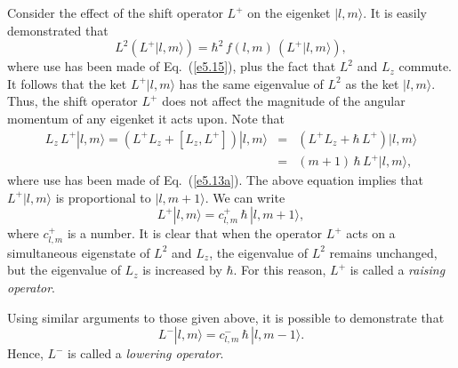 Consider the effect of the shift operator $L^+$ on the eigenket $|l, m\rangle$.
It is easily demonstrated that
\begin{equation}
L^2 (L^+ |l, m\rangle) = \hbar^2\, f(l,m)\, (L^+ |l,m\rangle),
\end{equation}
where use has been made of Eq.~(\ref{e5.15}), plus
the fact that $L^2$ and $L_z$ commute. 
It follows that the ket $L^+ |l,m\rangle$ has the same
eigenvalue of $L^2$ as the ket $|l,m\rangle$. Thus, the shift operator
$L^+$ does not affect the magnitude of the angular momentum of 
any eigenket it acts upon. Note that
\begin{eqnarray}
L_z \,L^+ |l, m\rangle = (L^+ L_z + [L_z, L^+])|l,m\rangle
&=& (L^+ L_z + \hbar\, L^+) |l,m\rangle\nonumber\\[0.5ex]
&=& (m+1)\,\hbar \,L^+|l, m\rangle,
\end{eqnarray}
where use has been made of Eq.~(\ref{e5.13a}). The above equation implies
that $L^+ |l,m\rangle$ is proportional to $|l, m+1\rangle$. We can
write
\begin{equation}\label{e5.23}
L^+ |l ,m\rangle = c^+_{l, m}\, \hbar\,|l, m+1\rangle,
\end{equation}
where $c^+_{l, m}$ is a number. It is clear that when the operator $L^+$ 
acts on a simultaneous  eigenstate of $L^2$ and $L_z$, 
the eigenvalue of $L^2$ remains unchanged, but the  eigenvalue
of $L_z$ is increased by $\hbar$. For this reason, $L^+$  is called
a {\em raising operator}. 

Using similar arguments to those given above, it is possible
to demonstrate that
\begin{equation}\label{e5.24}
L^- |l ,m\rangle = c^-_{l, m}\,\hbar\, |l, m-1\rangle.
\end{equation}
Hence, $L^-$ is called a {\em lowering operator}. 

